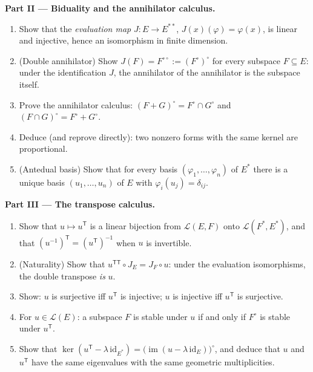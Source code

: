 \begin{problem}
\medskip
\noindent\textbf{Part II --- Biduality and the annihilator
calculus.}
\begin{enumerate}[resume]
  \item Show that the \emph{evaluation map} $J \colon E \to
        E^{**}$, $J(x)(\varphi) = \varphi(x)$, is linear and
        injective, hence an isomorphism in finite dimension.
  \item (Double annihilator) Show $J(F) = F^{\circ\circ} :=
        (F^\circ)^\circ$ for every subspace $F \subseteq E$: under
        the identification $J$, the annihilator of the annihilator
        is the subspace itself.
  \item Prove the annihilator calculus: $(F + G)^\circ = F^\circ
        \cap G^\circ$ and $(F \cap G)^\circ = F^\circ + G^\circ$.
  \item Deduce (and reprove directly): two nonzero forms with the
        same kernel are proportional.
  \item (Antedual basis) Show that for every basis $(\varphi_1,
        \dots, \varphi_n)$ of $E^*$ there is a unique basis
        $(u_1, \dots, u_n)$ of $E$ with $\varphi_i(u_j) =
        \delta_{ij}$.
\end{enumerate}

\medskip
\noindent\textbf{Part III --- The transpose calculus.}
\begin{enumerate}[resume]
  \item Show that $u \mapsto u^{\mathsf T}$ is a linear bijection
        from $\mathcal{L}(E, F)$ onto $\mathcal{L}(F^*, E^*)$,
        and that $(u^{-1})^{\mathsf T} = (u^{\mathsf T})^{-1}$
        when $u$ is invertible.
  \item (Naturality) Show that $u^{\mathsf T\mathsf T} \circ J_E
        = J_F \circ u$: under the evaluation isomorphisms, the
        double transpose \emph{is} $u$.
  \item Show: $u$ is surjective iff $u^{\mathsf T}$ is injective;
        $u$ is injective iff $u^{\mathsf T}$ is surjective.
  \item For $u \in \mathcal{L}(E)$: a subspace $F$ is stable
        under $u$ if and only if $F^\circ$ is stable under
        $u^{\mathsf T}$.
  \item Show that $\ker(u^{\mathsf T} - \lambda\,
        \mathrm{id}_{E^*}) = \bigl(\operatorname{im}(u - \lambda\,
        \mathrm{id}_E)\bigr)^\circ$, and deduce that $u$ and
        $u^{\mathsf T}$ have the same eigenvalues with the same
        geometric multiplicities.
\end{enumerate}


\end{problem}
